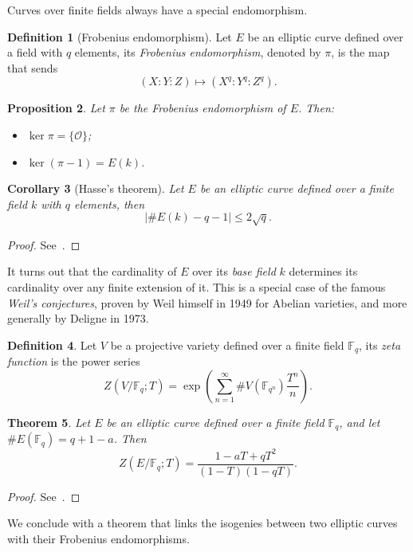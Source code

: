 \documentclass[10pt]{article}
\theoremstyle{plain}
\newtheorem{theorem}{Theorem}
\newtheorem{corollary}[theorem]{Corollary}
\newtheorem{proposition}[theorem]{Proposition}
\theoremstyle{definition}
\newtheorem{definition}[theorem]{Definition}
\def\F{\ensuremath{\mathbb{F}}}
\def\O{\ensuremath{\mathcal{O}}}
\begin{document}
Curves over finite fields always have a special endomorphism.

\begin{definition}[Frobenius endomorphism]
  Let $E$ be an elliptic curve defined over a field with $q$ elements,
  its \emph{Frobenius endomorphism}, denoted by $π$, is the map that
  sends
  \[(X:Y:Z) \mapsto (X^q:Y^q:Z^q).\]
\end{definition}

\begin{proposition}
  \label{th:frob}
  Let $π$ be the Frobenius endomorphism of $E$. Then:
  \begin{itemize}
  \item $\ker π = \{\O\}$;
  \item $\ker (π-1) = E(k)$.
  \end{itemize}
\end{proposition}

\begin{corollary}[Hasse's theorem]
  Let $E$ be an elliptic curve defined over a finite field $k$ with $q$
  elements, then
  \[|\#E(k) - q - 1| ≤ 2\sqrt{q}.\]
\end{corollary}
\begin{proof}
  See~\cite[V, Th.~1.1]{silverman:elliptic}.
\end{proof}

It turns out that the cardinality of $E$ over its \emph{base field}
$k$ determines its cardinality over any finite extension of it. %
This is a special case of the famous \emph{Weil's
  conjectures}, proven by Weil himself in 1949 for Abelian varieties,
and more generally by Deligne in 1973.

\begin{definition}
  Let $V$ be a projective variety defined over a finite field $\F_q$,
  its \emph{zeta function} is the power series
  \[Z(V/\F_q; T) = \exp\left(\sum_{n=1}^∞\#V(\F_{q^n})\frac{T^n}{n}\right).\]
\end{definition}

\begin{theorem}
  \label{th:weil}
  Let $E$ be an elliptic curve defined over a finite field
  $\F_q$, and let $\#E(\F_q)=q+1-a$. Then
  \[Z(E/\F_q;T) = \frac{1-aT+qT^2}{(1-T)(1-qT)}.\]
\end{theorem}
\begin{proof}
  See~\cite[V, Th.~2.4]{silverman:elliptic}.
\end{proof}

We conclude with a theorem that links the isogenies between two
elliptic curves with their Frobenius endomorphisms.
\end{document}
